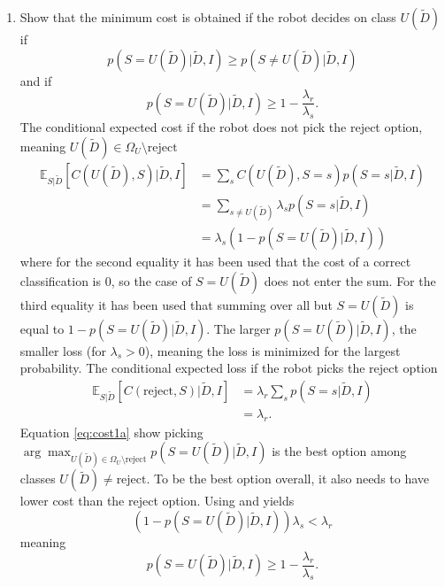 \begin{example}
	\begin{enumerate}
		\item Show that the minimum cost is obtained if the robot decides on class $U(\tilde{D})$ if
		\begin{equation}
			p(S=U(\tilde{D})|\tilde{D},I)\geq p(S\neq U(\tilde{D})|\tilde{D},I)
		\end{equation}
		 and if 
		 \begin{equation}
		 	p(S=U(\tilde{D})|\tilde{D},I)\geq 1-\frac{\lambda_r}{\lambda_s}.
		 \end{equation}
		The conditional expected cost if the robot does not pick the reject option, meaning $U(\tilde{D})\in \Omega_U\setminus\text{reject}$
		\begin{equation}
			\begin{split}
				\mathbb{E}_{S|\tilde{D}}[C(U(\tilde{D}), S)|\tilde{D},I] & = \sum_s C(U(\tilde{D}),S=s)p(S=s|\tilde{D},I)\\
				&= \sum_{s\neq U(\tilde{D})}\lambda_sp(S=s|\tilde{D},I)\\
				&= \lambda_s(1-p(S=U(\tilde{D})|\tilde{D},I))
			\end{split}
			\label{eq:cost1a}
		\end{equation}
		where for the second equality it has been used that the cost of a correct classification is $0$, so the case of $S=U(\tilde{D})$ does not enter the sum. For the third equality it has been used that summing over all but $S=U(\tilde{D})$ is equal to $1-p(S=U(\tilde{D})|\tilde{D},I)$. The larger $p(S=U(\tilde{D})|\tilde{D},I)$, the smaller loss (for $\lambda_s>0$), meaning the loss is minimized for the largest probability. The conditional expected loss if the robot picks the reject option
		\begin{equation}
			\begin{split}
				\mathbb{E}_{S|\tilde{D}}[C(\text{reject}, S)|\tilde{D},I]&= \lambda_r\sum_sp(S=s|\tilde{D},I)\\
				&=\lambda_r.
			\end{split}
			\label{eq:cost2a}
		\end{equation}
		Equation \eqref{eq:cost1a} show picking $\arg\max_{U(\tilde{D})\in \Omega_U\setminus \text{reject}} p(S=U(\tilde{D})|\tilde{D},I)$ is the best option among classes $U(\tilde{D})\neq \text{reject}$. To be the best option overall, it also needs to have lower cost than the reject option. Using  and  yields
		\begin{equation}
			(1-p(S=U(\tilde{D})|\tilde{D},I))\lambda_s< \lambda_r
		\end{equation}
		meaning
		\begin{equation}
			p(S=U(\tilde{D})|\tilde{D},I)\geq 1-\frac{\lambda_r}{\lambda_s}.
		\end{equation}
		

\end{enumerate}
\end{example}

